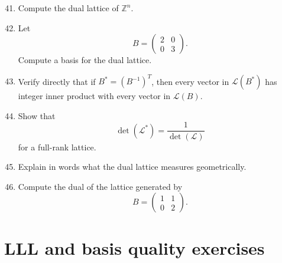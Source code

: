 \documentclass[11pt]{article}
\begin{document}
\begin{enumerate}
	\setcounter{enumi}{40}
	\item Compute the dual lattice of \(\mathbb{Z}^n\).
	
	\item Let
	\[
	B=
	\begin{pmatrix}
		2 & 0\\
		0 & 3
	\end{pmatrix}.
	\]
	Compute a basis for the dual lattice.
	
	\item Verify directly that if \(B^*=(B^{-1})^T\), then every vector in \(\mathcal{L}(B^*)\) has integer inner product with every vector in \(\mathcal{L}(B)\).
	
	\item Show that
	\[
	\det(\mathcal{L}^*)=\frac{1}{\det(\mathcal{L})}
	\]
	for a full-rank lattice.
	
	\item Explain in words what the dual lattice measures geometrically.
	
	\item Compute the dual of the lattice generated by
	\[
	B=
	\begin{pmatrix}
		1 & 1\\
		0 & 2
	\end{pmatrix}.
	\]
\end{enumerate}

\section{LLL and basis quality exercises}
\end{document}

